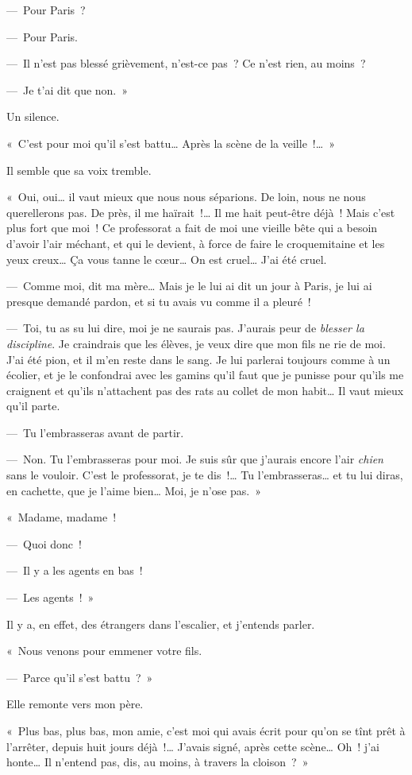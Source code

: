 \documentclass[french,twoside]{book} %
\begin{document}
— Pour Paris ?\par
— Pour Paris.\par
— Il n’est pas blessé grièvement, n’est-ce pas ? Ce n’est rien, au moins ?\par
— Je t’ai dit que non. »\par
Un silence.\par
« C’est pour moi qu’il s’est battu… Après la scène de la veille !… »\par
Il semble que sa voix tremble.\par
« Oui, oui… il vaut mieux que nous nous séparions. De loin, nous ne nous querellerons pas. De près, il me haïrait !… Il me hait peut-être déjà ! Mais c’est plus fort que moi ! Ce professorat a fait de moi une vieille bête qui a besoin d’avoir l’air méchant, et qui le devient, à force de faire le croquemitaine et les yeux creux… Ça vous tanne le cœur… On est cruel… J’ai été cruel.\par
— Comme moi, dit ma mère… Mais je le lui ai dit un jour à Paris, je lui ai presque demandé pardon, et si tu avais vu comme il a pleuré !\par
— Toi, tu as su lui dire, moi je ne saurais pas. J’aurais peur de \emph{blesser la discipline}. Je craindrais que les élèves, je veux dire que mon fils ne rie de moi. J’ai été pion, et il m’en reste dans le sang. Je lui parlerai toujours comme à un écolier, et je le confondrai avec les gamins qu’il faut que je punisse pour qu’ils me craignent et qu’ils n’attachent pas des rats au collet de mon habit… Il vaut mieux qu’il parte.\par
— Tu l’embrasseras avant de partir.\par
— Non. Tu l’embrasseras pour moi. Je suis sûr que j’aurais encore l’air \emph{chien} sans le vouloir. C’est le professorat, je te dis !… Tu l’embrasseras… et tu lui diras, en cachette, que je l’aime bien… Moi, je n’ose pas. »\par
\bigbreak
\noindent « Madame, madame !\par
— Quoi donc !\par
— Il y a les agents en bas !\par
— Les agents ! »\par
Il y a, en effet, des étrangers dans l’escalier, et j’entends parler.\par
« Nous venons pour emmener votre fils.\par
— Parce qu’il s’est battu ? »\par
Elle remonte vers mon père.\par
« Plus bas, plus bas, mon amie, c’est moi qui avais écrit pour qu’on se tînt prêt à l’arrêter, depuis huit jours déjà !… J’avais signé, après cette scène… Oh ! j’ai honte… Il n’entend pas, dis, au moins, à travers la cloison ? »\par
\end{document}

